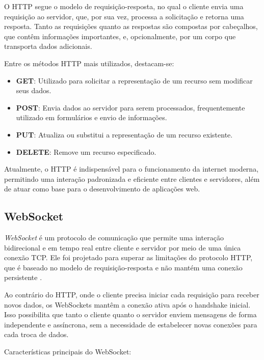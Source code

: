 O HTTP segue o modelo de requisição-resposta, no qual o cliente envia uma requisição ao servidor, que, por sua vez, processa a solicitação e retorna uma resposta. Tanto as requisições quanto as respostas são compostas por cabeçalhos, que contêm informações importantes, e, opcionalmente, por um corpo que transporta dados adicionais.

Entre os métodos HTTP mais utilizados, destacam-se:

\begin{itemize}
    \item \textbf{GET}: Utilizado para solicitar a representação de um recurso sem modificar seus dados.
    \item \textbf{POST}: Envia dados ao servidor para serem processados, frequentemente utilizado em formulários e envio de informações.
    \item \textbf{PUT}: Atualiza ou substitui a representação de um recurso existente.
    \item \textbf{DELETE}: Remove um recurso especificado.
\end{itemize}

Atualmente, o HTTP é indispensável para o funcionamento da internet moderna, permitindo uma interação padronizada e eficiente entre clientes e servidores, além de atuar como base para o desenvolvimento de aplicações web.

\subsection{WebSocket}

\emph{WebSocket} é um protocolo de comunicação que permite uma interação bidirecional e em tempo real entre cliente e servidor por meio de uma única conexão TCP. Ele foi projetado para superar as limitações do protocolo HTTP, que é baseado no modelo de requisição-resposta e não mantém uma conexão persistente \cite{ws-standard}.

Ao contrário do HTTP, onde o cliente precisa iniciar cada requisição para receber novos dados, os WebSockets mantêm a conexão ativa após o handshake inicial. Isso possibilita que tanto o cliente quanto o servidor enviem mensagens de forma independente e assíncrona, sem a necessidade de estabelecer novas conexões para cada troca de dados. 

Características principais do WebSocket:

